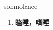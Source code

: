 
\begin{frame}
{\huge somnolence}
\begin{center}
\begin{enumerate}\Large
  \item \textbf{瞌睡，嗜睡}
\end{enumerate}
\end{center}
\end{frame}

